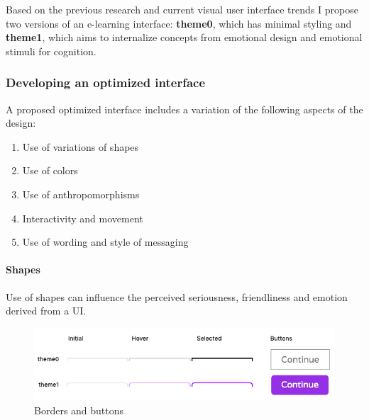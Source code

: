 	Based on the previous research and current visual user interface trends I propose two versions of an e-learning interface: \textbf{theme0}, which has minimal styling and \textbf{theme1}, which aims to internalize concepts from emotional design and emotional stimuli for cognition.
	
	


%	
	
	\subsubsection{Developing an optimized interface}
	
	A proposed optimized interface includes a variation of the following aspects of the design:
	
	\begin{enumerate}
		\item Use of variations of shapes
		\item Use of colors
		\item Use of anthropomorphisms
		\item Interactivity and movement
		\item Use of wording and style of messaging
	\end{enumerate}

	\paragraph{Shapes} Use of shapes can influence the perceived seriousness, friendliness and emotion derived from a UI.
	
\begin{figure}[h!]
	\centering
	\includegraphics[width=0.8\linewidth]{graphics/designfeatures/Borders1}
	\caption{Borders and buttons }
	\label{fig:borders1}
\end{figure}

